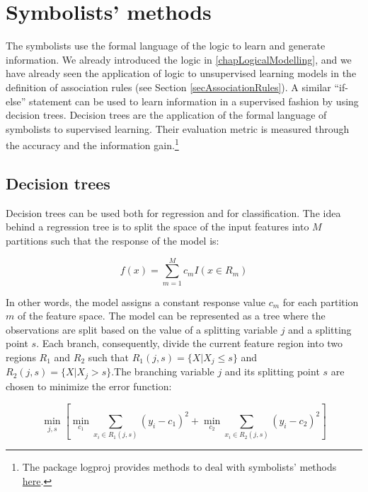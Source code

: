 \section{Symbolists’ methods} 

The symbolists use the formal language of the logic to learn and generate information. We already introduced the logic in \ref{chapLogicalModelling}, and we have already seen the application of logic to unsupervised learning models in the definition of association rules (see Section \ref{secAssociationRules}). A similar “if-else” statement can be used to learn information in a supervised fashion by using decision trees. Decision trees are the application of the formal language of symbolists to supervised learning. Their evaluation metric is measured through the accuracy and the information gain.\footnote{The package logproj provides methods to deal with symbolists' methods \href{https://github.com/aletuf93/logproj/blob/master/logproj/M_learningMethod/symbolists_models.py}{here}.}

\subsection{Decision trees} \label{secDecisionTrees}
Decision trees can be used both for regression and for classification. The idea behind a regression tree is to split the space of the input features into $M$ partitions such that the response of the model is:

\begin{equation}
        f\left(x\right)=\sum_{m=1}^{M}{c_mI\left(x\in R_m\right)}
        \label{eq_decisionTree1}
\end{equation}

In other words, the model assigns a constant response value $c_m$ for each partition $m$ of the feature space. The model can be represented as a tree where the observations are split based on the value of a splitting variable $j$ and a splitting point $s$. Each branch, consequently, divide the current feature region into two regions $R_1$ and $R_2$ such that $R_1\left(j,s\right)=\{X|X_j\le s\}$ and  $R_2\left(j,s\right)=\{X|X_j>s\}$.The branching variable $j$ and its splitting point $s$ are chosen to minimize the error function:

\begin{equation}
        \min_{j,s}{\left[\min_{c_1}{\sum_{x_i\in R_1(j,s)}\left(y_i-c_1\right)^2}+\min_{c_2}{\sum_{x_i\in R_2(j,s)}\left(y_i-c_2\right)^2}\right]}
        \label{eq_decisionTree2}
\end{equation}

